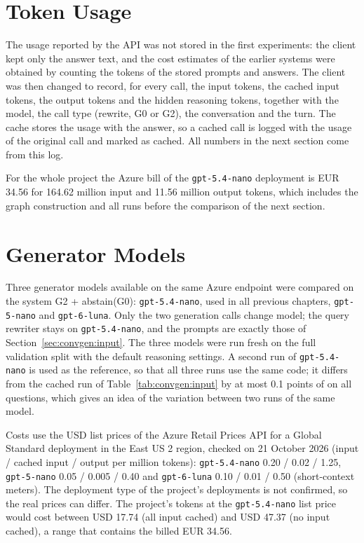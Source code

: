 \section{Token Usage}\label{sec:convgen:tokens}

The usage reported by the API was not stored in the first experiments: the client kept
only the answer text, and the cost estimates of the earlier systems were obtained by
counting the tokens of the stored prompts and answers. The client was then changed to
record, for every call, the input tokens, the cached input tokens, the output tokens and
the hidden reasoning tokens, together with the model, the call type (rewrite, G0 or G2),
the conversation and the turn. The cache stores the usage with the answer, so a cached
call is logged with the usage of the original call and marked as cached. All numbers in
the next section come from this log.

For the whole project the Azure bill of the \texttt{gpt-5.4-nano} deployment is EUR 34.56
for 164.62 million input and 11.56 million output tokens, which includes the graph
construction and all runs before the comparison of the next section.


\section{Generator Models}\label{sec:convgen:models}

Three generator models available on the same Azure endpoint were compared on the system
G2 + abstain(G0): \texttt{gpt-5.4-nano}, used in all previous chapters, \texttt{gpt-5-nano}
and \texttt{gpt-6-luna}. Only the two generation calls change model; the query rewriter
stays on \texttt{gpt-5.4-nano}, and the prompts are exactly those of
Section~\ref{sec:convgen:input}. The three models were run fresh on the full validation
split with the default reasoning settings. A second run of \texttt{gpt-5.4-nano} is used as
the reference, so that all three runs use the same code; it differs from the cached run of
Table~\ref{tab:convgen:input} by at most 0.1 points of \fone{} on all questions, which
gives an idea of the variation between two runs of the same model.

Costs use the USD list prices of the Azure Retail Prices API for a Global Standard
deployment in the East US 2 region, checked on 21 October 2026 (input / cached input /
output per million tokens): \texttt{gpt-5.4-nano} 0.20 / 0.02 / 1.25, \texttt{gpt-5-nano}
0.05 / 0.005 / 0.40 and \texttt{gpt-6-luna} 0.10 / 0.01 / 0.50 (short-context meters). The
deployment type of the project's deployments is not confirmed, so the real prices can
differ. The project's tokens at the \texttt{gpt-5.4-nano} list price would cost between USD
17.74 (all input cached) and USD 47.37 (no input cached), a range that contains the billed
EUR 34.56.

